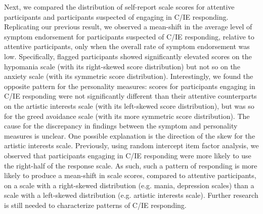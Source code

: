 \documentclass[a4paper,notitlepage,12pt]{article}
\begin{document}
\begin{refsection}[supp]
Next, we compared the distribution of self-report scale scores for attentive participants and participants suspected of engaging in C/IE responding. Replicating our previous result, we observed a mean-shift in the average level of symptom endorsement for participants suspected of C/IE responding, relative to attentive participants, only when the overall rate of symptom endorsement was low. Specifically, flagged participants showed significantly elevated scores on the hypomania scale (with its right-skewed score distribution) but not so on the anxiety scale (with its symmetric score distribution). Interestingly, we found the opposite pattern for the personality measures: scores for participants engaging in C/IE responding were not significantly different than their attentive counterparts on the artistic interests scale (with its left-skewed score distribution), but was so for the greed avoidance scale (with its more symmetric score distribution). The cause for the discrepancy in findings between the symptom and personality measures is unclear. One possible explanation is the direction of the skew for the artistic interests scale. Previously, using random intercept item factor analysis, we observed that participants engaging in C/IE responding were more likely to use the right-half of the response scale. As such, such a pattern of responding is more likely to produce a mean-shift in scale scores, compared to attentive participants, on a scale with a right-skewed distribution (e.g. mania, depression scales) than a scale with a left-skewed distribution (e.g. artistic interests scale). Further research is still needed to characterize patterns of C/IE responding. 


\end{refsection}
\end{document}
